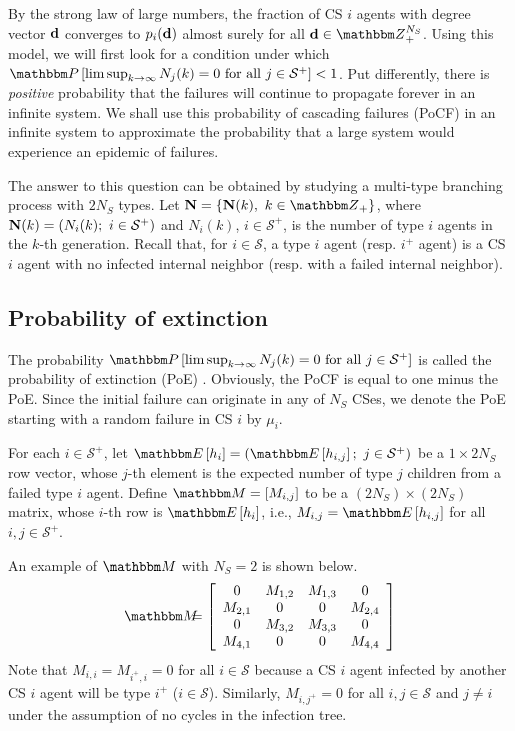 \documentclass[10pt, journal, compsoc]{IEEEtran}
\newcommand {\cS}{{\mathcal{S}}}
\newcommand {\bM} {{\mathbbm M}}
\newcommand {\bd} {{\bf d}}
\newcommand {\Z} {{\mathbbm Z}}
\newcommand{\beqan}{\begin{eqnarray*}}
\newcommand{\eeqan}{\end{eqnarray*}}
\newcommand{\myeq}{& \hspace{-0.1in} = & \hspace{-0.1in}}
\newcommand{\E}[1]{{\mathbbm E}\left[ #1 \right]}
\newcommand{\bP}[1]{{\mathbbm P}\left[ #1 \right]}
\newcommand{\myskip}{\\ \vspace{-0.1in}}
\begin{document}
By the strong law of large numbers, the fraction 
of CS $i$ agents with degree vector $\bd$ converges 
to $p_i(\bd)$ almost surely for all $\bd \in 
\Z_+^{N_S}$. Using this model, we will first look 
for a condition under which $\bP{
\limsup_{k \to \infty} N_j(k) = 0 \mbox{ for
all } j \in \cS^+} < 1$.
Put differently, there is {\em positive}
probability that the failures will continue to
propagate forever 
in an infinite system. We shall use 
this probability of cascading failures 
(PoCF) in an
infinite system to approximate the probability
that a large system would experience an epidemic
of failures. 

The answer to this question can be obtained by
studying a multi-type branching process with 
$2 N_S$ types. Let ${\bf N} = \{{\bf N}(k), \ 
k \in \Z_+\}$, where ${\bf N}(k) = (N_i(k); \ 
i \in \cS^+)$
and $N_i(k)$, $i \in \cS^+$, is the number of 
type $i$ agents in the $k$-th generation. 
Recall that, for $i \in \cS$, 
a type $i$ agent (resp. $i^+$ agent) 
is a CS $i$ agent with no infected internal 
neighbor (resp. with a failed internal
neighbor). 




\subsection{Probability of extinction}

The probability $\bP{ \limsup_{k \to \infty} 
N_j(k) = 0 \mbox{ for all } j \in \cS^+}$ is 
called the probability of extinction (PoE)
\cite{Harris}. Obviously, the PoCF 
is equal to one minus the 
PoE. Since the initial failure
can originate in any of $N_S$ CSes, we denote 
the PoE starting with a random failure in CS 
$i$ by $\mu_i$.

For each $i \in \cS^+$, let
$\E{h_i} = (\E{h_{i,j}}; \ j \in \cS^+)$
be a $1 \times 2 N_S$ row 
vector,
whose $j$-th element is the expected number of
type $j$ children from a failed type 
$i$ agent. Define $\bM = [M_{i,j}]$ to be 
a $(2 N_S) \times (2 N_S)$ matrix, whose
$i$-th row is $\E{h_i}$, i.e., 
$M_{i,j} = \E{h_{i,j}}$ for all $i, j
\in \cS^+$. 

An example of $\bM$ with $N_S = 2$ is shown below. 
\beqan
\bM
\myeq \left[ 
	\begin{array}{cccc}
	0 & M_{1,2} & M_{1,3} & 0 \\
	M_{2,1} & 0 & 0 & M_{2,4} \\
	0 & M_{3,2} & M_{3,3} & 0 \\
	M_{4,1} & 0 & 0 & M_{4,4} \\
	\end{array}
\right]
\eeqan
Note that $M_{i,i} = M_{i^+, i} = 0$ for all 
$i \in \cS$ because a CS $i$ agent infected 
by another CS $i$ agent will be type 
$i^+$ ($i \in \cS$). 
Similarly, $M_{i, j^+} = 0$ for all $i, j \in 
\cS$ and $j \neq i$ under the assumption
of no cycles in the infection tree.  
\end{document}
